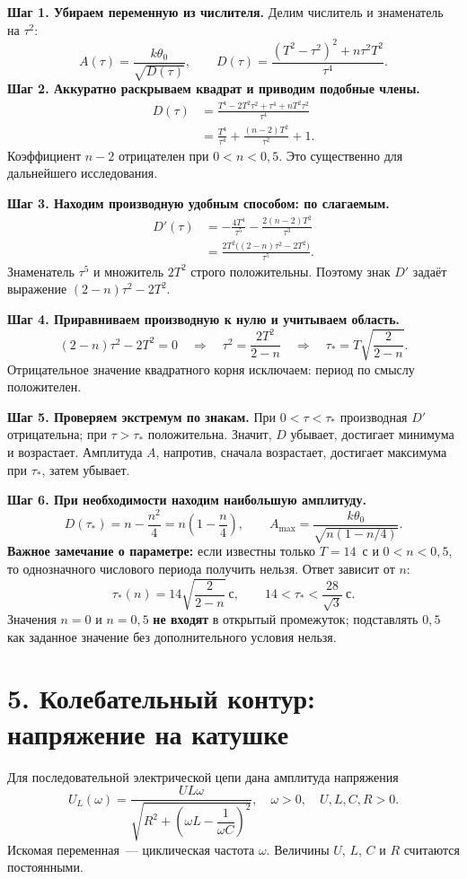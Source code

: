 \documentclass[a4paper,12pt]{article}
\newcommand{\key}[1]{\textcolor{darkaccent}{\textbf{#1}}}
\begin{document}
\textbf{Шаг 1. Убираем переменную из числителя.} Делим числитель и знаменатель на $\tau^2$:
\[
A(\tau)=\frac{k\theta_0}{\sqrt{D(\tau)}},\qquad
D(\tau)=\frac{(T^2-\tau^2)^2+n\tau^2T^2}{\tau^4}.
\]
\textbf{Шаг 2. Аккуратно раскрываем квадрат и приводим подобные члены.}
\[
\begin{aligned}
D(\tau)&=\frac{T^4-2T^2\tau^2+\tau^4+nT^2\tau^2}{\tau^4}\\
&=\frac{T^4}{\tau^4}+\frac{(n-2)T^2}{\tau^2}+1.
\end{aligned}
\]
Коэффициент \textbf{$n-2$} отрицателен при $0<n<0{,}5$. Это существенно для дальнейшего исследования.

\textbf{Шаг 3. Находим производную удобным способом: по слагаемым.}
\[
\begin{aligned}
D'(\tau)&=-\frac{4T^4}{\tau^5}-\frac{2(n-2)T^2}{\tau^3}\\
&=\frac{2T^2\bigl((2-n)\tau^2-2T^2\bigr)}{\tau^5}.
\end{aligned}
\]
Знаменатель $\tau^5$ и множитель $2T^2$ строго положительны. Поэтому знак $D'$ задаёт выражение $(2-n)\tau^2-2T^2$.

\textbf{Шаг 4. Приравниваем производную к нулю и учитываем область.}
\[
(2-n)\tau^2-2T^2=0
\quad\Longrightarrow\quad
\tau^2=\frac{2T^2}{2-n}
\quad\Longrightarrow\quad
\boxed{\tau_*=T\sqrt{\frac{2}{2-n}}}.
\]
Отрицательное значение квадратного корня исключаем: период по смыслу положителен.

\textbf{Шаг 5. Проверяем экстремум по знакам.} При $0<\tau<\tau_*$ производная $D'$ отрицательна; при $\tau>\tau_*$ положительна. Значит, $D$ убывает, достигает минимума и возрастает. Амплитуда $A$, напротив, сначала возрастает, достигает максимума при $\tau_*$, затем убывает.

\textbf{Шаг 6. При необходимости находим наибольшую амплитуду.}
\[
D(\tau_*)=n-\frac{n^2}{4}
=n\left(1-\frac n4\right),\qquad
\boxed{A_{\max}=\frac{k\theta_0}{\sqrt{n(1-n/4)}}}.
\]
\key{Важное замечание о параметре:} если известны только $T=14$~с и $0<n<0{,}5$, то однозначного числового периода получить нельзя. Ответ зависит от $n$:
\[
\tau_*(n)=14\sqrt{\frac{2}{2-n}}\ \text{с},\qquad
14<\tau_*<\frac{28}{\sqrt3}\ \text{с}.
\]
Значения $n=0$ и $n=0{,}5$ \textbf{не входят} в открытый промежуток; подставлять $0{,}5$ как заданное значение без дополнительного условия нельзя.

\section*{5. Колебательный контур: напряжение на катушке}
Для последовательной электрической цепи дана амплитуда напряжения
\[
U_L(\omega)=\frac{UL\omega}
{\sqrt{R^2+\left(\omega L-\dfrac{1}{\omega C}\right)^2}},
\quad \omega>0,\quad U,L,C,R>0.
\]
Искомая переменная~--- циклическая частота $\omega$. Величины $U$, $L$, $C$ и $R$ считаются постоянными.
\end{document}
